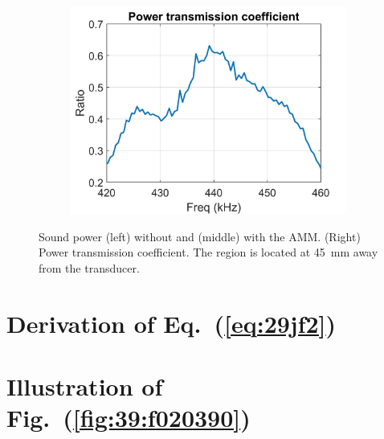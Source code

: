 \documentclass{article}
\begin{document}
\begin{figure}[!htb]
\begin{subfigure}{0.32\textwidth}
        \includegraphics[width = \textwidth]{../../matlab/exp/fig/CalPowTransCoef_230302C_PowCoefAMM.jpg}
    \end{subfigure}
    \caption{
        Sound power (left) without and (middle) with the AMM.
        (Right) Power transmission coefficient.
    The region is located at 45~mm away from the transducer.}
    \label{fig:f9j:0213921j09j}
\end{figure}




\begin{appendices}

\section{Derivation of Eq.~(\ref{eq:29jf2})}
\lipsum[1]

\lipsum[1]

\lipsum[1]

\section{Illustration of Fig.~(\ref{fig:39:f020390})}
\lipsum[1]

\lipsum[1]
\end{appendices}




\end{document}
